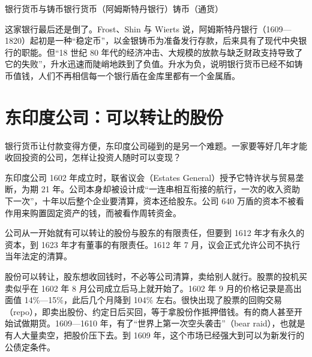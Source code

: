\begin{compare}{银行货币与铸币}{银行货币（阿姆斯特丹银行）}{铸币（通货）}
\end{compare}

这家银行最后还是倒了。Frost、Shin 与 Wierts 说，阿姆斯特丹银行（1609—1820）起初是一种“稳定币”，以金银铸币为准备发行存款，后来具有了现代中央银行的职能。但“18 世纪 80 年代的经济冲击、大规模的放款与缺乏财政支持导致了它的失败”，升水迅速而陡峭地跌到了负值\cite{fsw2020}。升水为负，说明银行货币已经不如铸币值钱，人们不再相信每一个银行盾在金库里都有一个金属盾。

\section{东印度公司：可以转让的股份}\label{sec:finrev-voc}

银行货币让付款变得方便，东印度公司碰到的是另一个难题。一家要等好几年才能收回投资的公司，怎样让投资人随时可以变现？

东印度公司 1602 年成立时，联省议会（Estates General）授予它特许状与贸易垄断，为期 21 年。公司本身却被设计成“一连串相互衔接的航行，一次的收入资助下一次”，十年以后整个企业要清算，资本还给股东\cite{gdj2012}。公司 640 万盾的资本不被看作用来购置固定资产的钱，而被看作周转资金\cite{gdj2012}。

公司从一开始就有可以转让的股份与股东的有限责任，但要到 1612 年才有永久的资本，到 1623 年才有董事的有限责任。1612 年 7 月，议会正式允许公司不执行当年法定的清算\cite{gdj2012}。

股份可以转让，股东想收回钱时，不必等公司清算，卖给别人就行。股票的投机买卖似乎在 1602 年 8 月公司成立后马上就开始了。1602 年 9 月的价格记录是高出面值 14\%—15\%，此后几个月降到 104\% 左右。很快出现了股票的回购交易（repo），即卖出股份、约定日后买回，等于拿股份作抵押借钱。有的商人甚至开始试做期货。1609—1610 年，有了“世界上第一次空头袭击”（bear raid），也就是有人大量卖空，把股价压下去\cite{gj2004}。到 1609 年，这个市场已经强大到可以为新发行的公债定条件\cite{gj2004}。

